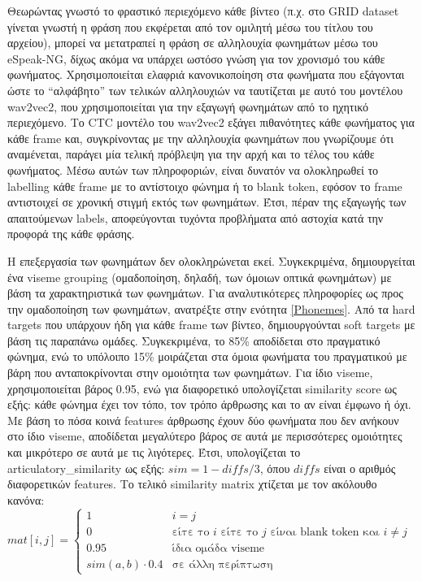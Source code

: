 Θεωρώντας γνωστό το φραστικό περιεχόμενο κάθε βίντεο (π.χ. στο GRID dataset γίνεται γνωστή η φράση που εκφέρεται από τον ομιλητή μέσω του τίτλου του αρχείου), μπορεί να μετατραπεί η φράση σε αλληλουχία φωνημάτων μέσω του eSpeak-NG, δίχως ακόμα να υπάρχει ωστόσο γνώση για τον χρονισμό του κάθε φωνήματος. Χρησιμοποιείται ελαφριά κανονικοποίηση στα φωνήματα που εξάγονται ώστε το ``αλφάβητο'' των τελικών αλληλουχιών να ταυτίζεται με αυτό του μοντέλου wav2vec2, που χρησιμοποιείται για την εξαγωγή φωνημάτων από το ηχητικό περιεχόμενο. Το CTC μοντέλο του wav2vec2 εξάγει πιθανότητες κάθε φωνήματος για κάθε frame και, συγκρίνοντας με την αλληλουχία φωνημάτων που γνωρίζουμε ότι αναμένεται, παράγει μία τελική πρόβλεψη για την αρχή και το τέλος του κάθε φωνήματος. Μέσω αυτών των πληροφοριών, είναι δυνατόν να ολοκληρωθεί το labelling κάθε frame με το αντίστοιχο φώνημα ή το blank token, εφόσον το frame αντιστοιχεί σε χρονική στιγμή εκτός των φωνημάτων. Έτσι, πέραν της εξαγωγής των απαιτούμενων labels, αποφεύγονται τυχόντα προβλήματα από αστοχία κατά την προφορά της κάθε φράσης.

Η επεξεργασία των φωνημάτων δεν ολοκληρώνεται εκεί. Συγκεκριμένα, δημιουργείται ένα viseme grouping (ομαδοποίηση, δηλαδή, των όμοιων οπτικά φωνημάτων) με βάση τα χαρακτηριστικά των φωνημάτων. Για αναλυτικότερες πληροφορίες ως προς την ομαδοποίηση των φωνημάτων, ανατρέξτε στην ενότητα \ref{Phonemes}. Από τα hard targets που υπάρχουν ήδη για κάθε frame των βίντεο, δημιουργούνται soft targets με βάση τις παραπάνω ομάδες. Συγκεκριμένα, το 85\% αποδίδεται στο πραγματικό φώνημα, ενώ το υπόλοιπο 15\% μοιράζεται στα όμοια φωνήματα του πραγματικού με βάρη που ανταποκρίνονται στην ομοιότητα των φωνημάτων. Για ίδιο viseme, χρησιμοποιείται βάρος 0.95, ενώ για διαφορετικό υπολογίζεται similarity score ως εξής: κάθε φώνημα έχει τον τόπο, τον τρόπο άρθρωσης και το αν είναι έμφωνο ή όχι. Με βάση το πόσα κοινά features άρθρωσης έχουν δύο φωνήματα που δεν ανήκουν στο ίδιο viseme, αποδίδεται μεγαλύτερο βάρος σε αυτά με περισσότερες ομοιότητες και μικρότερο σε αυτά με τις λιγότερες. Έτσι, υπολογίζεται το articulatory\_similarity ως εξής: $sim = 1 - diffs / 3$, όπου $diffs$ είναι ο αριθμός διαφορετικών features. Το τελικό similarity matrix χτίζεται με τον ακόλουθο κανόνα:
$mat[i,j] = \begin{cases}
1 & i = j \\
0 & \text{είτε το }i \text{ είτε το }j \text{ είναι blank token και } i \neq j\\
0.95 & \text{ίδια ομάδα viseme} \\
sim(a,b) \cdot 0.4 & \text{σε άλλη περίπτωση} 
\end{cases}
$

